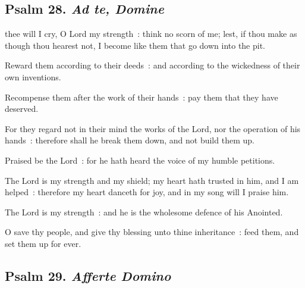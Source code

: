 \subsection{Psalm 28. \textit{Ad te, Domine}}


 thee will I cry, O Lord my strength~: think no scorn of me; lest, if thou make as though thou hearest not, I become like them that go down into the pit.\par
{}
Reward them according to their deeds~: and according to the wickedness of their own inventions.\par
{}Recompense them after the work of their hands~: pay them that they have deserved.\par
{}For they regard not in their mind the works of the Lord, nor the operation of his hands~: therefore shall he break them down, and not build them up.\par
{}Praised be the Lord~: for he hath heard the voice of my humble petitions.\par
{}The Lord is my strength and my shield; my heart hath trusted in him, and I am helped~: therefore my heart danceth for joy, and in my song will I praise him.\par
{}The Lord is my strength~: and he is the wholesome defence of his Anointed.\par
{}O save thy people, and give thy blessing unto thine inheritance~: feed them, and set them up for ever.\par

\subsection{Psalm 29. \textit{Afferte Domino}}


